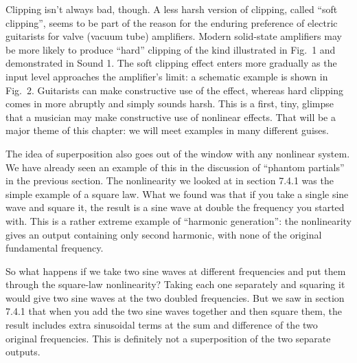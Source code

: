 
  Clipping isn’t always bad, though. A less harsh version of clipping, called 
  “soft clipping”, seems to be part of the reason for the enduring preference 
  of electric guitarists for valve (vacuum tube) amplifiers. Modern solid-state 
  amplifiers may be more likely to produce “hard” clipping of the kind 
  illustrated in Fig.\ 1 and demonstrated in Sound 1. The soft clipping effect 
  enters more gradually as the input level approaches the amplifier's limit: a 
  schematic example is shown in Fig.\ 2. Guitarists can make constructive use 
  of the effect, whereas hard clipping comes in more abruptly and simply sounds 
  harsh. This is a first, tiny, glimpse that a musician may make constructive 
  use of nonlinear effects. That will be a major theme of this chapter: we will 
  meet examples in many different guises. 



  The idea of superposition also goes out of the window with any nonlinear 
  system. We have already seen an example of this in the discussion of “phantom 
  partials” in the previous section. The nonlinearity we looked at in section 
  7.4.1 was the simple example of a square law. What we found was that if you 
  take a single sine wave and square it, the result is a sine wave at double 
  the frequency you started with. This is a rather extreme example of 
  ``harmonic generation'': the nonlinearity gives an output containing only 
  second harmonic, with none of the original fundamental frequency. 

  So what happens if we take two sine waves at different frequencies and put 
  them through the square-law nonlinearity? Taking each one separately and 
  squaring it would give two sine waves at the two doubled frequencies. But we 
  saw in section 7.4.1 that when you add the two sine waves together and then 
  square them, the result includes extra sinusoidal terms at the sum and 
  difference of the two original frequencies. This is definitely not a 
  superposition of the two separate outputs. 

